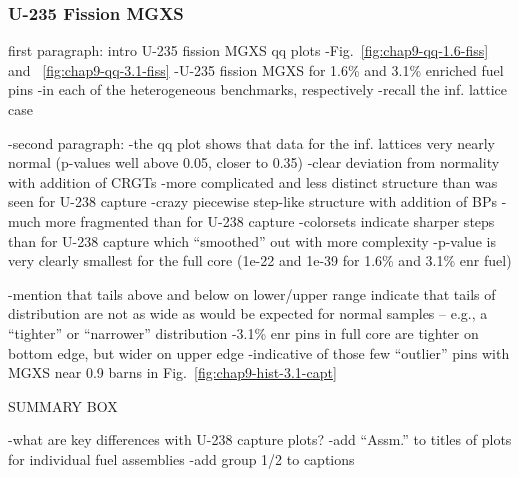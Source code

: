 \subsubsection{U-235 Fission MGXS}
\label{subsubsec:chap9-qq-plots-fiss}

first paragraph: intro U-235 fission \ac{MGXS} qq plots
-Fig.~\ref{fig:chap9-qq-1.6-fiss} and ~\ref{fig:chap9-qq-3.1-fiss}
  -U-235 fission \ac{MGXS} for 1.6\% and 3.1\% enriched fuel pins
  -in each of the heterogeneous benchmarks, respectively
-recall the inf. lattice case

-second paragraph:
  -the qq plot shows that data for the inf. lattices very nearly normal (p-values well above 0.05, closer to 0.35)
  -clear deviation from normality with addition of \acp{CRGT}
    -more complicated and less distinct structure than was seen for U-238 capture
  -crazy piecewise step-like structure with addition of \acp{BP}
    -much more fragmented than for U-238 capture
  -colorsets indicate sharper steps than for U-238 capture which ``smoothed'' out with more complexity
  -p-value is very clearly smallest for the full core (1e-22 and 1e-39 for 1.6\% and 3.1\% enr fuel)

-mention that tails above and below on lower/upper range indicate that tails of distribution are not as wide as would be expected for normal samples -- e.g., a ``tighter'' or ``narrower'' distribution
-3.1\% enr pins in full core are tighter on bottom edge, but wider on upper edge
  -indicative of those few ``outlier'' pins with \ac{MGXS} near 0.9 barns in Fig.~\ref{fig:chap9-hist-3.1-capt}

SUMMARY BOX

-what are key differences with U-238 capture plots?
-add ``Assm.'' to titles of plots for individual fuel assemblies
-add group 1/2 to captions

